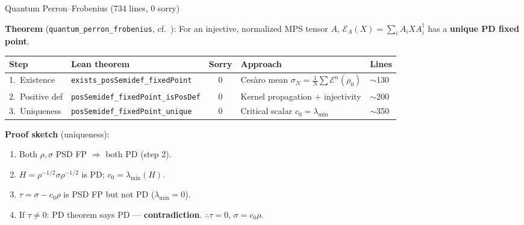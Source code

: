 \documentclass[aspectratio=169,10pt]{beamer}
\begin{document}
\begin{frame}{Quantum Perron--Frobenius \textcolor{leangreen}{(734 lines, 0 sorry)}}
    \vspace{-0.5em}

    \textbf{Theorem} (\texttt{quantum\_perron\_frobenius}, cf.\ \cite{Evans1978Spectral}):
    {\small For an injective, normalized MPS tensor $A$,
    $\mathcal{E}_A(X) = \sum_i A_i X A_i^\dagger$ has a \textbf{unique PD fixed point}.}

    \vspace{0.15em}
    {\footnotesize
    \begin{tabular}{@{}llcll@{}}
        \toprule
        \textbf{Step} & \textbf{Lean theorem} & \textbf{Sorry} & \textbf{Approach} & \textbf{Lines} \\
        \midrule
        \rowcolor{cardbg}
        1.\ Existence & \texttt{exists\_posSemidef\_fixedPoint} & \textcolor{leangreen}{0} &
            Ces\`aro mean $\sigma_N = \frac{1}{N}\sum\mathcal{E}^n(\rho_0)$ & $\sim$130 \\
        2.\ Positive def & \texttt{posSemidef\_fixedPoint\_isPosDef} & \textcolor{leangreen}{0} &
            Kernel propagation + injectivity & $\sim$200 \\
        \rowcolor{cardbg}
        3.\ Uniqueness & \texttt{posSemidef\_fixedPoint\_unique} & \textcolor{leangreen}{0} &
            Critical scalar $c_0 = \lambda_{\min}$ & $\sim$350 \\
        \bottomrule
    \end{tabular}
    }

    \vspace{0.2em}
    {\small\textbf{Proof sketch} (uniqueness):}
    \begin{enumerate}\itemsep0em\scriptsize
        \item Both $\rho, \sigma$ PSD FP $\Rightarrow$ both PD (step 2).
        \item $H = \rho^{-1/2}\sigma\rho^{-1/2}$ is PD; $c_0 = \lambda_{\min}(H)$.
        \item $\tau = \sigma - c_0\rho$ is PSD FP but not PD ($\lambda_{\min} = 0$).
        \item If $\tau \neq 0$: PD theorem says PD --- \textbf{contradiction}. $\therefore \tau = 0$, $\sigma = c_0 \rho$.
    \end{enumerate}

    \vspace{0.1em}
    \begin{center}
    \end{center}
\end{frame}
\end{document}
